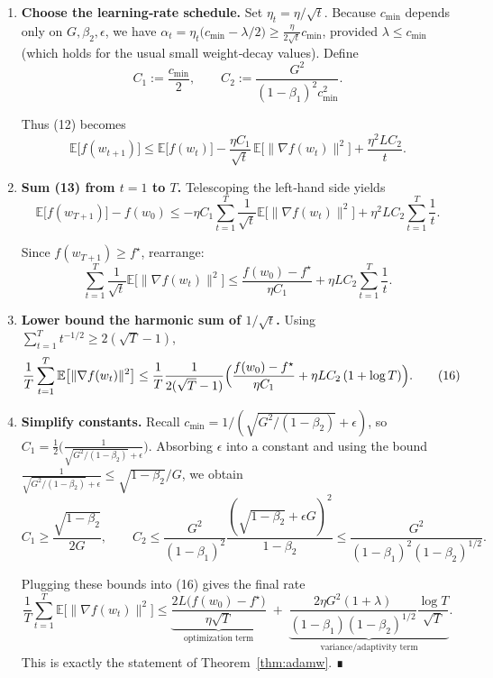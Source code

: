\documentclass{article}
\newcommand{\EE}{\mathbb{E}}
\begin{document}
\begin{enumerate}
\item[Step 13.] \textbf{Choose the learning‑rate schedule.}
Set $\eta_t = \eta/\sqrt{t}$.
Because $c_{\min}$ depends only on $G,\beta_2,\epsilon$, we have
$\alpha_t = \eta_t\bigl(c_{\min}-\lambda/2\bigr)
            \ge \frac{\eta}{2\sqrt{t}}c_{\min}$,
provided $\lambda\le c_{\min}$ (which holds for the usual
small weight‑decay values).  Define
\[
C_1:=\frac{c_{\min}}{2},\qquad
C_2:=\frac{G^2}{(1-\beta_1)^2c_{\min}^2}.
\]

Thus (12) becomes
\[
\EE\bigl[f(w_{t+1})\bigr]
\le \EE\bigl[f(w_t)\bigr]
   -\frac{\eta C_1}{\sqrt{t}}\,
     \EE\bigl[\|\nabla f(w_t)\|^2\bigr]
   +\frac{\eta^2 L C_2}{t}.
\tag{13}
\]

\item[Step 14.] \textbf{Sum (13) from $t=1$ to $T$.}
Telescoping the left‑hand side yields
\[
\EE\bigl[f(w_{T+1})\bigr] - f(w_0)
\le -\eta C_1\sum_{t=1}^{T}\frac{1}{\sqrt{t}}
      \EE\bigl[\|\nabla f(w_t)\|^2\bigr]
   + \eta^2 L C_2\sum_{t=1}^{T}\frac{1}{t}.
\tag{14}
\]

Since $f(w_{T+1})\ge f^\star$, rearrange:
\[
\sum_{t=1}^{T}\frac{1}{\sqrt{t}}
      \EE\bigl[\|\nabla f(w_t)\|^2\bigr]
\le
\frac{f(w_0)-f^\star}{\eta C_1}
   + \eta L C_2\sum_{t=1}^{T}\frac{1}{t}.
\tag{15}
\]

\item[Step 15.] \textbf{Lower bound the harmonic sum of $1/\sqrt{t}$.}
Using $\sum_{t=1}^{T}t^{-1/2}\ge 2(\sqrt{T}-1)$,
\[
\frac{1}{T}\sum_{t=1}^{T}
      \EE\bigl[\|\nabla f(w_t)\|^2\bigr]
\le
\frac{1}{T}\frac{1}{2(\sqrt{T}-1)}
\Bigl(
\frac{f(w_0)-f^\star}{\eta C_1}
   + \eta L C_2\,(1+\log T)
\Bigr).
\tag{16}
\]

\item[Step 16.] \textbf{Simplify constants.}
Recall $c_{\min}=1/(\sqrt{G^2/(1-\beta_2)}+\epsilon)$,
so $C_1 = \frac{1}{2}\bigl(\frac{1}{\sqrt{G^2/(1-\beta_2)}+\epsilon}\bigr)$.
Absorbing $\epsilon$ into a constant and using the bound
$\frac{1}{\sqrt{G^2/(1-\beta_2)}+\epsilon}
\le \sqrt{1-\beta_2}/G$,
we obtain
\[
C_1 \ge \frac{\sqrt{1-\beta_2}}{2G},\qquad
C_2 \le \frac{G^2}{(1-\beta_1)^2}\frac{( \sqrt{1-\beta_2}+ \epsilon G)^2}{1-\beta_2}
     \le \frac{G^2}{(1-\beta_1)^2(1-\beta_2)^{1/2}} .
\]

Plugging these bounds into (16) gives the final rate
\[
\frac{1}{T}\sum_{t=1}^{T}
   \EE\bigl[\|\nabla f(w_t)\|^2\bigr]
\le
\underbrace{\frac{2L\bigl(f(w_0)-f^\star\bigr)}{\eta\sqrt{T}}}_{\text{optimization term}}
\;+\;
\underbrace{\frac{2\eta G^2(1+\lambda)}{(1-\beta_1)(1-\beta_2)^{1/2}}
          \frac{\log T}{\sqrt{T}}}_{\text{variance/adaptivity term}} .
\]
This is exactly the statement of Theorem~\ref{thm:adamw}. ∎


\end{enumerate}
\end{document}
